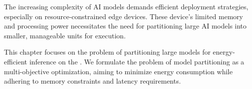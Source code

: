 The increasing complexity of AI models demands efficient deployment strategies, especially on resource-constrained edge devices.
These device's limited memory and processing power necessitates the need for partitioning large AI models into smaller, manageable units for execution.

This chapter focuses on the problem of partitioning large models for energy-efficient inference on the \graicore{}.
We formulate the problem of model partitioning as a multi-objective optimization, aiming to minimize energy consumption while adhering to memory constraints and latency requirements.